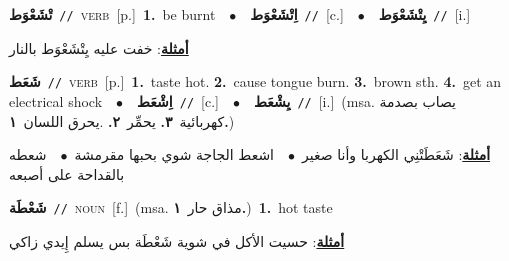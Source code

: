 \documentclass[10pt,a4paper,twoside]{article} %
\begin{document}
\begin{multicols}{2}
{\setlength\topsep{0pt}\textbf{\foreignlanguage{arabic}{تْشَعْوَط}}\ {\color{gray}\texttt{//}\color{black}}\ \textsc{verb}\ [p.]\ \textbf{1.}~be burnt\ \ $\bullet$\ \ \setlength\topsep{0pt}\textbf{\foreignlanguage{arabic}{اِتْشَعْوَط}}\ {\color{gray}\texttt{//}\color{black}}\ [c.]\ \ $\bullet$\ \ \setlength\topsep{0pt}\textbf{\foreignlanguage{arabic}{يِتْشَعْوَط}}\ {\color{gray}\texttt{//}\color{black}}\ [i.]\  \begin{flushright}\color{gray}\foreignlanguage{arabic}{\textbf{\underline{\foreignlanguage{arabic}{أمثلة}}}: خفت عليه يِتْشَعْوَط بالنار}\end{flushright}\color{black}} \vspace{2mm}

{\setlength\topsep{0pt}\textbf{\foreignlanguage{arabic}{شَعَط}}\ {\color{gray}\texttt{//}\color{black}}\ \textsc{verb}\ [p.]\ \textbf{1.}~taste hot.  \textbf{2.}~cause tongue burn.  \textbf{3.}~brown sth.  \textbf{4.}~get an electrical shock\ \ $\bullet$\ \ \setlength\topsep{0pt}\textbf{\foreignlanguage{arabic}{اِشْعَط}}\ {\color{gray}\texttt{//}\color{black}}\ [c.]\ \ $\bullet$\ \ \setlength\topsep{0pt}\textbf{\foreignlanguage{arabic}{يِشْعَط}}\ {\color{gray}\texttt{//}\color{black}}\ [i.]\ \color{gray}(msa. \foreignlanguage{arabic}{يصاب بصدمة كهربائية}~\foreignlanguage{arabic}{\textbf{٣.}}  \foreignlanguage{arabic}{يحمِّر}~\foreignlanguage{arabic}{\textbf{٢.}}  .\foreignlanguage{arabic}{يحرق اللسان}~\foreignlanguage{arabic}{\textbf{١.}})\color{black}\  \begin{flushright}\color{gray}\foreignlanguage{arabic}{\textbf{\underline{\foreignlanguage{arabic}{أمثلة}}}: شَعَطَتْنِي الكهربا وأنا صغير\ $\bullet$\ \  اشعط الجاجة شوي بحبها مقرمشة\ $\bullet$\ \  شعطه بالقداحة على أصبعه}\end{flushright}\color{black}} \vspace{2mm}

{\setlength\topsep{0pt}\textbf{\foreignlanguage{arabic}{شَعْطَة}}\ {\color{gray}\texttt{//}\color{black}}\ \textsc{noun}\ [f.]\ \color{gray}(msa. \foreignlanguage{arabic}{مذاق حار}~\foreignlanguage{arabic}{\textbf{١.}})\color{black}\ \textbf{1.}~hot taste\  \begin{flushright}\color{gray}\foreignlanguage{arabic}{\textbf{\underline{\foreignlanguage{arabic}{أمثلة}}}: حسيت الأكل في شوية شَعْطَة بس يسلم إِيدي زاكي}\end{flushright}\color{black}} \vspace{2mm}


\end{multicols}
\end{document}
